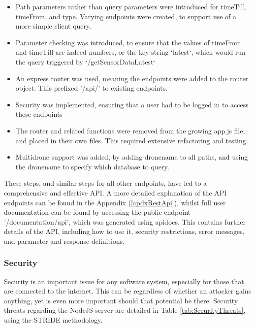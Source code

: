 \documentclass{article}
\begin{document}
\begin{itemize}
	\item Path parameters rather than query parameters were introduced for timeTill, timeFrom, and type. Varying endpoints were created, to support use of a more simple client query. 
	\item Parameter checking was introduced, to ensure that the values of timeFrom and timeTill are indeed numbers, or the key-string `latest`, which would run the query triggered by `/getSensorDataLatest`
	\item An express router was used, meaning the endpoints were added to the router object. This prefixed '/api/' to existing endpoints. 
	\item Security was implemented, ensuring that a user had to be logged in to access these endpoints
	\item The router and related functions were removed from the growing app.js file, and placed in their own files. This required extensive refactoring and testing.
	\item Multidrone support was added, by adding dronename to all paths, and using the dronename to specify which database to query.
\end{itemize}

These steps, and similar steps for all other endpoints, have led to a comprehensive and effective API. A more detailed explanation of the API endpoints can be found in the Appendix (\ref{apdxRestApi}), whilst full user documentation can be found by accessing the public endpoint '/documentation/api', which was generated using apidocs\cite{apidocs}. This contains further details of the API, including how to use it, security restrictions, error messages, and parameter and response definitions.

\subsubsection{Security}
Security is an important issue for any software system, especially for those that are connected to the internet. This can be regardless of whether an attacker gains anything, yet is even more important should that potential be there. Security threats regarding the NodeJS server are detailed in Table \ref{tab:SecurityThreats}, using the STRIDE methodology\cite{stride}.
\end{document}

